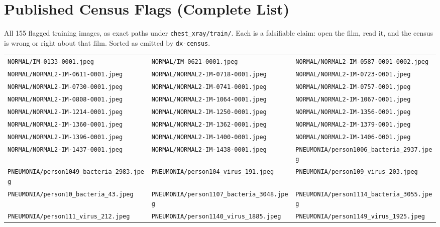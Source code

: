 
\clearpage
\section*{Published Census Flags (Complete List)}
All 155 flagged training images, as exact paths under
\texttt{chest\_xray/train/}. Each is a falsifiable claim: open the film,
read it, and the census is wrong or right about that film. Sorted as
emitted by \texttt{dx-census}.
\begin{center}
\footnotesize
\begin{longtable}{lll}
\hline
\endhead
\texttt{NORMAL/IM-0133-0001.jpeg} & \texttt{NORMAL/IM-0621-0001.jpeg} & \texttt{NORMAL/NORMAL2-IM-0587-0001-0002.jpeg} \\
\texttt{NORMAL/NORMAL2-IM-0611-0001.jpeg} & \texttt{NORMAL/NORMAL2-IM-0718-0001.jpeg} & \texttt{NORMAL/NORMAL2-IM-0723-0001.jpeg} \\
\texttt{NORMAL/NORMAL2-IM-0730-0001.jpeg} & \texttt{NORMAL/NORMAL2-IM-0741-0001.jpeg} & \texttt{NORMAL/NORMAL2-IM-0757-0001.jpeg} \\
\texttt{NORMAL/NORMAL2-IM-0808-0001.jpeg} & \texttt{NORMAL/NORMAL2-IM-1064-0001.jpeg} & \texttt{NORMAL/NORMAL2-IM-1067-0001.jpeg} \\
\texttt{NORMAL/NORMAL2-IM-1214-0001.jpeg} & \texttt{NORMAL/NORMAL2-IM-1250-0001.jpeg} & \texttt{NORMAL/NORMAL2-IM-1356-0001.jpeg} \\
\texttt{NORMAL/NORMAL2-IM-1360-0001.jpeg} & \texttt{NORMAL/NORMAL2-IM-1362-0001.jpeg} & \texttt{NORMAL/NORMAL2-IM-1379-0001.jpeg} \\
\texttt{NORMAL/NORMAL2-IM-1396-0001.jpeg} & \texttt{NORMAL/NORMAL2-IM-1400-0001.jpeg} & \texttt{NORMAL/NORMAL2-IM-1406-0001.jpeg} \\
\texttt{NORMAL/NORMAL2-IM-1437-0001.jpeg} & \texttt{NORMAL/NORMAL2-IM-1438-0001.jpeg} & \texttt{PNEUMONIA/person1006\_bacteria\_2937.jpeg} \\
\texttt{PNEUMONIA/person1049\_bacteria\_2983.jpeg} & \texttt{PNEUMONIA/person104\_virus\_191.jpeg} & \texttt{PNEUMONIA/person109\_virus\_203.jpeg} \\
\texttt{PNEUMONIA/person10\_bacteria\_43.jpeg} & \texttt{PNEUMONIA/person1107\_bacteria\_3048.jpeg} & \texttt{PNEUMONIA/person1114\_bacteria\_3055.jpeg} \\
\texttt{PNEUMONIA/person111\_virus\_212.jpeg} & \texttt{PNEUMONIA/person1140\_virus\_1885.jpeg} & \texttt{PNEUMONIA/person1149\_virus\_1925.jpeg} \\

\end{longtable}
\end{center}

